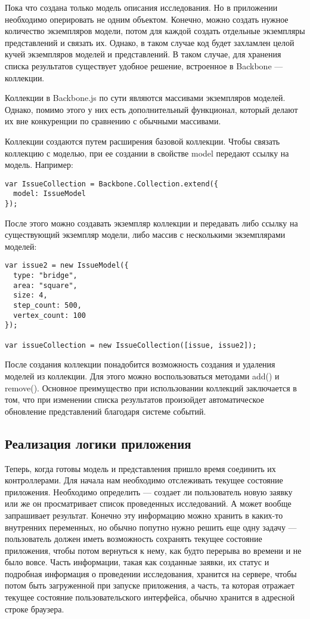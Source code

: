 Пока что создана только модель описания исследования. Но в приложении необходимо оперировать не одним объектом. Конечно, можно создать нужное количество экземпляров модели, потом для каждой создать отдельные экземпляры представлений и связать их. Однако, в таком случае код будет захламлен целой кучей экземпляров моделей и представлений. В таком случае, для хранения списка результатов существует удобное решение, встроенное в Backbone --- коллекции.

Коллекции в Backbone.js по сути являются массивами экземпляров моделей. Однако, помимо этого у них есть дополнительный функционал, который делают их вне конкуренции по сравнению с обычными массивами.

Коллекции создаются путем расширения базовой коллекции. Чтобы связать коллекцию с моделью, при ее создании в свойстве model передают ссылку на модель. Например:
\begin{lstlisting}
var IssueCollection = Backbone.Collection.extend({
  model: IssueModel
});
\end{lstlisting}
После этого можно создавать экземпляр коллекции и передавать либо ссылку на существующий экземпляр модели, либо массив с несколькими экземплярами моделей:
\begin{lstlisting}
var issue2 = new IssueModel({
  type: "bridge",
  area: "square",
  size: 4,
  step_count: 500,
  vertex_count: 100
});

var issueCollection = new IssueCollection([issue, issue2]);
\end{lstlisting}
После создания коллекции понадобится возможность создания и удаления моделей из коллекции. Для этого можно воспользоваться методами add() и remove(). Основное преимущество при использовании коллекций заключается в том, что при изменении списка результатов произойдет автоматическое обновление представлений благодаря системе событий.

\subsection{Реализация логики приложения}

Теперь, когда готовы модель и представления пришло время соединить их контроллерами. Для начала нам необходимо отслеживать текущее состояние приложения. Необходимо определить --- создает ли пользователь новую заявку или же он просматривает список проведенных исследований. А может вообще запрашивает результат.  Конечно эту информацию можно хранить в каких-то внутренних переменных, но обычно попутно нужно решить еще одну задачу — пользователь должен иметь возможность сохранять текущее состояние приложения, чтобы потом вернуться к нему, как будто перерыва во времени и не было вовсе. Часть информации, такая как созданные заявки, их статус и подробная информация о проведении исследования, хранится на сервере, чтобы потом быть загруженной при запуске приложения, а часть, та которая отражает текущее состояние пользовательского интерфейса, обычно хранится в адресной строке браузера. 

